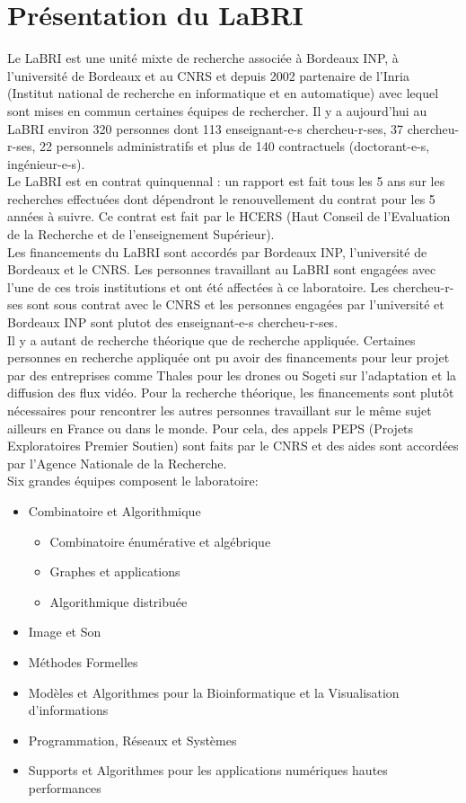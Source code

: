 \documentclass[a4paper]{article}
\begin{document}
\section{Présentation du LaBRI}
Le LaBRI est une unité mixte de recherche associée à Bordeaux INP, à l'université de Bordeaux et au CNRS et depuis 2002 partenaire de l'Inria (Institut national de recherche en informatique et en automatique) avec lequel sont mises en commun certaines équipes de rechercher. Il y a aujourd'hui au LaBRI environ 320 personnes dont 113 enseignant-e-s chercheu-r-ses, 37 chercheu-r-ses, 22 personnels administratifs et plus de 140 contractuels (doctorant-e-s, ingénieur-e-s).\vspace{1\baselineskip}\\
Le LaBRI est en contrat quinquennal : un rapport est fait tous les 5 ans sur les recherches effectuées dont dépendront le renouvellement du contrat pour les 5 années à suivre. Ce contrat est fait par le HCERS (Haut Conseil de l'Evaluation de la Recherche et de l'enseignement Supérieur).\\
Les financements du LaBRI sont accordés par Bordeaux INP, l'université de Bordeaux et le CNRS. Les personnes travaillant au LaBRI sont engagées avec l'une de ces trois institutions et ont été affectées à ce laboratoire. Les chercheu-r-ses sont sous contrat avec le CNRS et les personnes engagées par l'université et Bordeaux INP sont plutot des enseignant-e-s chercheu-r-ses.\\
Il y a autant de recherche théorique que de recherche appliquée. Certaines personnes en recherche appliquée ont pu avoir des financements pour leur projet par des entreprises comme Thales pour les drones ou Sogeti sur l'adaptation et la diffusion des flux vidéo. Pour la recherche théorique, les financements sont plutôt nécessaires pour rencontrer les autres personnes travaillant sur le même sujet ailleurs en France ou dans le monde. Pour cela, des appels PEPS (Projets Exploratoires Premier Soutien) sont faits par le CNRS et des aides sont accordées par l'Agence Nationale de la Recherche.\\
Six grandes équipes composent le laboratoire:
\begin{itemize}
\item Combinatoire et Algorithmique
  \begin{itemize}
  \item Combinatoire énumérative et algébrique
  \item Graphes et applications
  \item Algorithmique distribuée
    \end{itemize}
\item Image et Son
\item Méthodes Formelles
\item Modèles et Algorithmes pour la Bioinformatique et la Visualisation d'informations
\item Programmation, Réseaux et Systèmes
\item Supports et Algorithmes pour les applications numériques hautes performances
\end{itemize}
\end{document}
